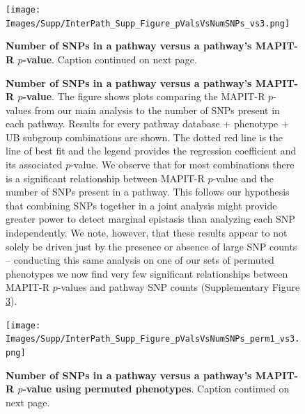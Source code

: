 \documentclass[12pt,a4paper]{article}
\begin{document}
\clearpage
\setlength{\footskip}{1cm}

\setlength{\footskip}{3cm}
\begin{figure}[htbp]
\centering
\vspace*{-2cm}
\texttt{[image: Images/Supp/InterPath\_Supp\_Figure\_pValsVsNumSNPs\_vs3.png]}
\caption[TBD]{\textbf{Number of SNPs in a pathway versus a pathway's MAPIT-R $p$-value}. Caption continued on next page.}
\label{InterPath-Supp-Figure-pValsVsNumSNPs}
\end{figure}
\clearpage
\setlength{\footskip}{1cm}

\addtocounter{figure}{-1}
\begin{figure} [t!]
  \caption{\textbf{Number of SNPs in a pathway versus a pathway's MAPIT-R $p$-value}. The figure shows plots comparing the MAPIT-R $p$-values from our main analysis to the number of SNPs present in each pathway. Results for every pathway database + phenotype + UB subgroup combinations are shown. The dotted red line is the line of best fit and the legend provides the regression coefficient and its associated $p$-value. We observe that for most combinations there is a significant relationship between MAPIT-R $p$-value and the number of SNPs present in a pathway. This follows our hypothesis that combining SNPs together in a joint analysis might provide greater power to detect marginal epistasis than analyzing each SNP independently. We note, however, that these results appear to not solely be driven just by the presence or absence of large SNP counts -- conducting this same analysis on one of our sets of permuted phenotypes we now find very few significant relationships between MAPIT-R $p$-values and pathway SNP counts (Supplementary Figure \ref{InterPath-Supp-Figure-pValsVsNumSNPs-perm1}).}
\label{InterPath-Supp-Figure-pValsVsNumSNPs-Caption}
\end{figure}
\clearpage

\setlength{\footskip}{3cm}
\begin{figure}[htbp]
\centering
\vspace*{-2cm}
\texttt{[image: Images/Supp/InterPath\_Supp\_Figure\_pValsVsNumSNPs\_perm1\_vs3.png]}
\caption[TBD]{\textbf{Number of SNPs in a pathway versus a pathway's MAPIT-R $p$-value using permuted phenotypes}. Caption continued on next page.}
\label{InterPath-Supp-Figure-pValsVsNumSNPs-perm1}
\end{figure}
\clearpage
\setlength{\footskip}{1cm}
\end{document}
